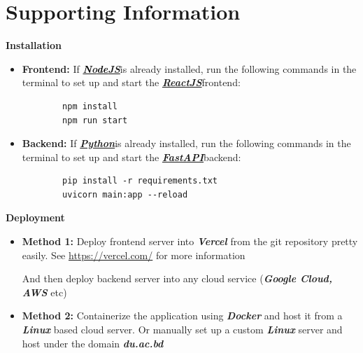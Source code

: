 \documentclass[11pt]{article}
\newcommand{\NodeJS}{\href{https://nodejs.org/en}{\textit{\textbf{\textcolor{black}{N}\textcolor{nodeColor}{o}\textcolor{black}{de}\textcolor{nodeColor}{JS}}}}}
\newcommand{\ReactJS}{\href{https://react.dev/}{\textbf{\textcolor{reactColor}{\textit{ReactJS}}}}}
\newcommand{\FastAPI}{\href{https://fastapi.tiangolo.com/}{\textbf{{\textcolor{fastAPIColor}{\textit{FastAPI}}}}}}
\newcommand{\Python}{\href{https://www.python.org/}{\textbf{{\textcolor{pythonColor}{\textit{Python}}}}}}
\begin{document}
\section{Supporting Information}
\begin{customItemize}
    \item \textbf{Installation}
    \begin{itemize}
        \item \textbf{Frontend:}  
        If \NodeJS\space is already installed, run the following commands in the terminal to set up and start the \ReactJS\space frontend:  
        \begin{verbatim}
        npm install
        npm run start
        \end{verbatim}

        \item \textbf{Backend:}  
        If \Python\space is already installed, run the following commands in the terminal to set up and start the \FastAPI\space backend:  
        \begin{verbatim}
        pip install -r requirements.txt
        uvicorn main:app --reload
        \end{verbatim}
    \end{itemize}

    \item \textbf{Deployment} \newline
    \begin{itemize}
        \item \textbf{Method 1:} Deploy frontend server into \textbf{\textit{Vercel}} from the git repository pretty easily. See \url{https://vercel.com/} for more information
        
            And then deploy backend server into any cloud service (\textit{\textbf{Google Cloud, AWS}} etc)
        
        \item \textbf{Method 2:} Containerize the application using \textbf{\textit{Docker}} and host it from a \textbf{\textit{Linux}} based cloud server. Or manually set up a custom \textbf{\textit{Linux}} server and host under the domain \textbf{\textit{du.ac.bd}}
    \end{itemize}
\end{customItemize}
\end{document}
